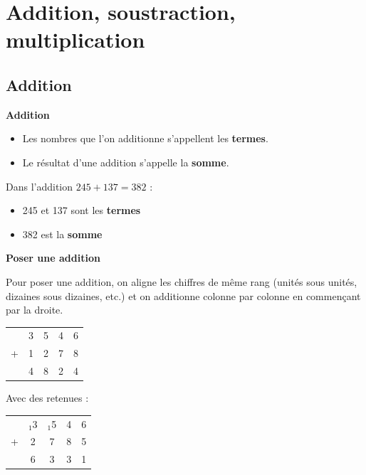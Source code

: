 \section{Addition, soustraction, multiplication}

\subsection{Addition}

\begin{definitionbox}
	\textbf{Addition}
	\begin{itemize}[label = \textbullet]
		\item Les nombres que l'on additionne s'appellent les \textbf{termes}.
		\item Le résultat d'une addition s'appelle la \textbf{somme}.
	\end{itemize}
\end{definitionbox}

\begin{examplebox}
	Dans l'addition $245 + 137 = 382$ :
	\begin{itemize}[label = \textbullet]
		\item 245 et 137 sont les \textbf{termes}
		\item 382 est la \textbf{somme}
	\end{itemize}
\end{examplebox}

\begin{methodebox}
	\textbf{Poser une addition}
	
	Pour poser une addition, on aligne les chiffres de même rang (unités sous unités, dizaines sous dizaines, etc.) et on additionne colonne par colonne en commençant par la droite.
	
	\begin{center}
		\begin{tabular}{ccccr}
			& 3 & 5 & 4 & 6 \\
			+ & 1 & 2 & 7 & 8 \\
			\hline
			& 4 & 8 & 2 & 4 \\
		\end{tabular}
	\end{center}
	
	Avec des retenues :
	\begin{center}
		\begin{tabular}{ccccr}
			& $_1$3 & $_1$5 & 4 & 6 \\
			+ &   2 &   7 & 8 & 5 \\
			\hline
			&   6 &   3 & 3 & 1 \\
		\end{tabular}
	\end{center}
\end{methodebox}

